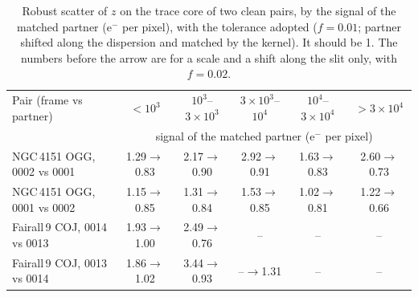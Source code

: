 \begin{table}[!htbp]
\centering\small
\caption{Robust scatter of $z$ on the trace core of two clean pairs, by the signal of the matched partner (e$^-$ per
pixel), with the tolerance adopted ($f=0.01$; partner shifted along the dispersion and matched by the kernel). It
should be 1. The numbers before the arrow are for a scale and a shift along the slit only, with $f=0.02$.}
\label{tab:cr_pair_tol}
\begin{tabular}{lccccc}
\toprule
Pair (frame vs partner) & $<10^3$ & $10^3$--$3\times10^3$ & $3\times10^3$--$10^4$ & $10^4$--$3\times10^4$ & $>3\times10^4$\\
 & \multicolumn{5}{c}{signal of the matched partner (e$^-$ per pixel)} \\
\midrule
NGC\,4151 OGG, 0002 vs 0001 & 1.29$\to$0.83 & 2.17$\to$0.90 & 2.92$\to$0.91 & 1.63$\to$0.83 & 2.60$\to$0.73\\
NGC\,4151 OGG, 0001 vs 0002 & 1.15$\to$0.85 & 1.31$\to$0.84 & 1.53$\to$0.85 & 1.02$\to$0.81 & 1.22$\to$0.66\\
Fairall\,9 COJ, 0014 vs 0013 & 1.93$\to$1.00 & 2.49$\to$0.76 & -- & -- & --\\
Fairall\,9 COJ, 0013 vs 0014 & 1.86$\to$1.02 & 3.44$\to$0.93 & --$\to$1.31 & -- & --\\
\bottomrule
\end{tabular}
\end{table}

